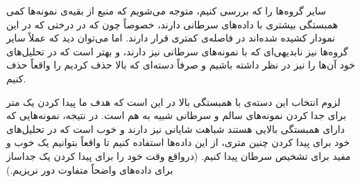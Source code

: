 \documentclass[12pt,onecolumn,a4paper]{article}
\begin{document}
سایر گروه‌ها را که بررسی کنیم، متوجه می‌شویم که منبع  از بقیه‌ی نمونه‌ها کمی همبستگی بیشتری با داده‌های سرطانی دارند، خصوصاً چون که در درختی که در این نمودار کشیده شده‌اند در فاصله‌ی کمتری قرار دارند. اما می‌توان دید که عملاً سایر گروه‌ها نیز  نابدیهی‌ای که با نمونه‌های سرطانی نیز دارند، و بهتر است که در تحلیل‌های خود آن‌ها را نیز در نظر داشته باشیم و صرفاً دسته‌ای که بالا حذف کردیم را واقعاً حذف کنیم.

لزوم انتخاب این دسته‌ی با همبستگی بالا در این است که هدف ما پیدا کردن یک متر  برای جدا کردن نمونه‌های سالم و سرطانی شبیه به هم است. در نتیجه، نمونه‌هایی که دارای همبستگی بالایی هستند شباهت شایانی نیز دارند و خوب است که در تحلیل‌های خود برای پیدا کردن چنین متری، از این داده‌ها استفاده کنیم تا واقعاً بتوانیم یک  خوب و مفید برای تشخیص سرطان پیدا کنیم. (درواقع وقت خود را برای پیدا کردن یک جداساز برای داده‌های واضحاً متفاوت دور نریزیم.)
\end{document}
